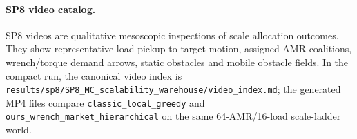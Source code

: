 \paragraph{SP8 video catalog.}
SP8 videos are qualitative mesoscopic inspections of scale allocation outcomes. They show representative load pickup-to-target motion, assigned AMR coalitions, wrench/torque demand arrows, static obstacles and mobile obstacle fields. In the compact run, the canonical video index is \texttt{results/sp8/SP8\_MC\_scalability\_warehouse/video\_index.md}; the generated MP4 files compare \texttt{classic\_local\_greedy} and \texttt{ours\_wrench\_market\_hierarchical} on the same 64-AMR/16-load scale-ladder world.
